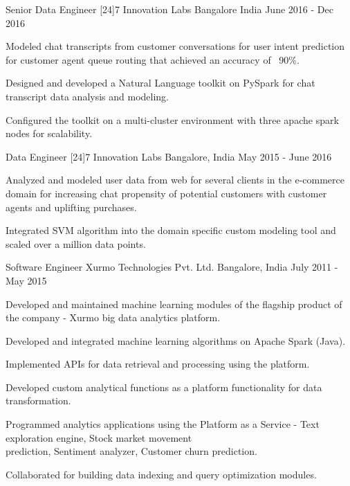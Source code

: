 \begin{cventries}
  \cventry
    {Senior Data Engineer}
    {[24]7 Innovation Labs}
    {Bangalore India}
    {June 2016 - Dec 2016}
    {
      \begin{cvitems}
        \item {Modeled chat transcripts from customer conversations for user intent prediction for customer agent queue routing that achieved an accuracy of ~90\%.}
        \item {Designed and developed a Natural Language toolkit on PySpark for chat transcript data analysis and modeling.}
        \item {Configured the toolkit on a multi-cluster environment with three apache spark nodes for scalability.}
      \end{cvitems}
    }
  \cventry
    {Data Engineer}
    {[24]7 Innovation Labs}
    {Bangalore, India}
    {May 2015 - June 2016}
    {
      \begin{cvitems}
        \item {Analyzed and modeled user data from web for several clients in the e-commerce domain for increasing chat propensity of potential customers with customer agents and uplifting purchases.}
        \item {Integrated SVM algorithm into the domain specific custom modeling tool and scaled over a million data points.}
      \end{cvitems}
    }
  \cventry
    {Software Engineer}
    {Xurmo Technologies Pvt. Ltd.}
    {Bangalore, India}
    {July 2011 - May 2015}
    {
      \begin{cvitems}
        \item {Developed and maintained machine learning modules of the flagship product of the company - Xurmo big data analytics platform.}
        \item {Developed and integrated machine learning algorithms on Apache Spark (Java).}
        \item {Implemented APIs for data retrieval and processing using the platform.}
        \item {Developed custom analytical functions as a platform functionality for data transformation.}
        \item {Programmed analytics applications using the Platform as a Service - Text exploration engine, Stock market movement \\ prediction, Sentiment analyzer, Customer churn prediction.}
        \item {Collaborated for building data indexing and query optimization modules.}
      \end{cvitems} 
    }
\end{cventries}
